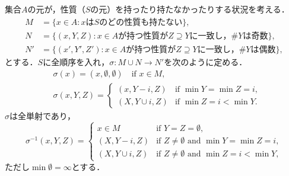 \documentclass[xelatex,ja=standard,a4paper,14pt,everyparhook=compat]{bxjsarticle}
\theoremstyle{definition}
\begin{document}
集合$A$の元が，性質（$S$の元）を持ったり持たなかったりする状況を考える． \begin{align*}
    M  & = \{x \in A: \text{$x$は$S$のどの性質も持たない}\},                                   \\
    N  & = \{(x, Y, Z): \text{$x \in A$が持つ性質が$Z \supseteq Y$に一致し，$\#Y$は奇数}\},    \\
    N' & = \{(x', Y', Z'): \text{$x \in A$が持つ性質が$Z \supseteq Y$に一致し，$\#Y$は偶数}\},
\end{align*}
とする．$S$に全順序を入れ，$\sigma: M \cup N \to N'$を次のように定める． \begin{align*}
     & \sigma(x) = (x, \emptyset, \emptyset) \quad \text{if $x \in M$}, \\
     & \sigma(x, Y, Z) = \begin{cases}
        (x, Y - i, Z)    & \text{if $\min Y = \min Z = i$}, \\
        (X, Y \cup i, Z) & \text{if $\min Z = i < \min Y$}.
    \end{cases}
\end{align*}
$\sigma$は全単射であり， \begin{equation*}
    \sigma^{-1}(x, Y, Z) = \begin{cases}
        x \in M          & \text{if $Y = Z = \emptyset$},                          \\
        (X, Y-i, Z)      & \text{if $Z \neq \emptyset$ and $\min Y = \min Z = i$}, \\
        (X, Y \cup i, Z) & \text{if $Z \neq \emptyset$ and $\min Z = i < \min Y$},
    \end{cases}
\end{equation*}
ただし$\min \emptyset = \infty$とする．
\end{document}
